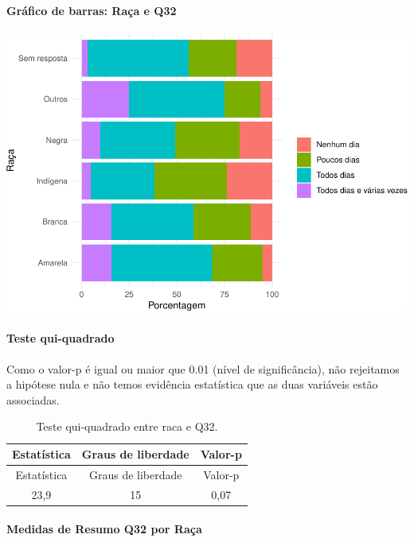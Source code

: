 \documentclass[]{article}
\let\oldparagraph\paragraph
\renewcommand{\paragraph}[1]{\oldparagraph{#1}\mbox{}}
\begin{document}
\hypertarget{gruxe1fico-de-barras-rauxe7a-e-q32}{%
\paragraph{Gráfico de barras: Raça e Q32}\label{gruxe1fico-de-barras-rauxe7a-e-q32}}

\begin{center}\includegraphics[width=0.75\linewidth]{relatorio_covid19_files/figure-latex/unnamed-chunk-1105-1} \end{center}

\hypertarget{teste-qui-quadrado-95}{%
\paragraph{Teste qui-quadrado}\label{teste-qui-quadrado-95}}

Como o valor-p é igual ou maior que 0.01 (nível de significância), não rejeitamos a hipótese nula e não temos evidência estatística que as duas variáveis estão associadas.

\begin{longtable}[]{@{}ccc@{}}
\caption{\label{tab:unnamed-chunk-1107}Teste qui-quadrado entre raca e Q32.}\tabularnewline
\toprule
Estatística & Graus de liberdade & Valor-p\tabularnewline
\midrule
\endfirsthead
\toprule
Estatística & Graus de liberdade & Valor-p\tabularnewline
\midrule
\endhead
23,9 & 15 & 0,07\tabularnewline
\bottomrule
\end{longtable}

\cleardoublepage

\hypertarget{medidas-de-resumo-q32-por-rauxe7a}{%
\paragraph{Medidas de Resumo Q32 por Raça}\label{medidas-de-resumo-q32-por-rauxe7a}}
\end{document}
